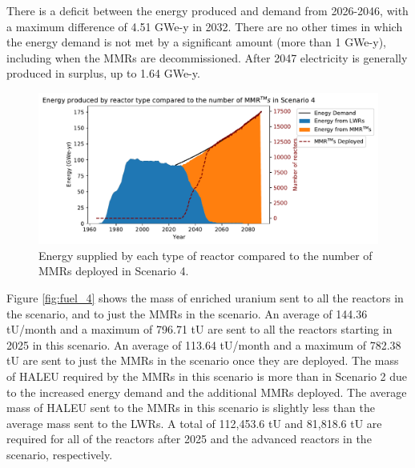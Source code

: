 There is a deficit between the energy produced and  
demand from 2026-2046, with a maximum difference of 4.51 GWe-y in 2032.
There are no other times in which the energy demand is not met by a 
significant amount (more than 1 GWe-y), including when the \glspl{MMR} are 
decommissioned. After 2047 electricity is generally produced in surplus, 
up to 1.64 GWe-y. 

\begin{figure}
    \centering 
    \includegraphics[width=\textwidth]{../figures/energy_scenario4.pdf}
    \caption{Energy supplied by each type of reactor compared to the number of 
    \glspl{MMR} deployed in Scenario 4.}
    \label{fig:energy_rx_4}
\end{figure}

Figure \ref{fig:fuel_4} shows the mass of enriched uranium sent to all the 
reactors in the scenario, and to just the \glspl{MMR} 
in the scenario. An average of 144.36 tU/month and a maximum of 796.71 tU
are sent to all the reactors starting in 2025 in this scenario. An average of 
113.64 tU/month and a maximum of 782.38 tU are sent to just the \glspl{MMR}
in the scenario once they are deployed. The mass of \gls{HALEU}
required by the \glspl{MMR} in this scenario is more than  
in Scenario 2 due to the increased energy 
demand and the additional \glspl{MMR} deployed. The 
average mass of \gls{HALEU} sent to the \glspl{MMR} in this scenario is 
slightly less than the average mass sent to the \glspl{LWR}. 
A total of 112,453.6 tU and 81,818.6 tU are required for all of the 
reactors after 2025 and the advanced reactors in the scenario, respectively. 

